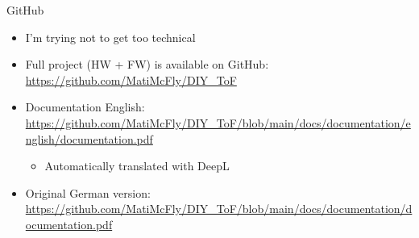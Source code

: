 \begin{frame}{GitHub}
    \begin{itemize}
        \item I'm trying not to get too technical
        \item Full project (HW + FW) is available on GitHub: \url{https://github.com/MatiMcFly/DIY_ToF}
        \item<2-> Documentation English: \url{https://github.com/MatiMcFly/DIY_ToF/blob/main/docs/documentation/english/documentation.pdf}
              \begin{itemize}
                  \item Automatically translated with DeepL
              \end{itemize}
        \item<2-> Original German version: \url{https://github.com/MatiMcFly/DIY_ToF/blob/main/docs/documentation/documentation.pdf}
    \end{itemize}
\end{frame}

